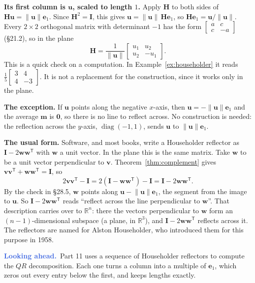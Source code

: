 \documentclass[11pt]{article}
\theoremstyle{plain}
\theoremstyle{definition}
\theoremstyle{remark}
\newcommand{\lookahead}{\par\smallskip\noindent
  \textbf{\sffamily\textcolor{RoyalBlue}{Looking ahead.}}\ \ignorespaces}
\newcommand{\R}{\mathbb{R}}
\newcommand{\vc}[1]{\mathbf{#1}}
\newcommand{\mt}[1]{\mathbf{#1}}
\newcommand{\norm}[1]{\lVert #1\rVert}
\newcommand{\T}{^{\mathsf{T}}}
\DeclareMathOperator{\diagop}{diag}
\begin{document}
\medskip
\noindent\textbf{Its first column is $\vc{u}$, scaled to length $1$.} Apply
$\mt{H}$ to both sides of $\mt{H}\vc{u}=\norm{\vc{u}}\vc{e}_1$. Since
$\mt{H}^{2}=\mt{I}$, this gives $\vc{u}=\norm{\vc{u}}\,\mt{H}\vc{e}_1$, so
$\mt{H}\vc{e}_1=\vc{u}/\norm{\vc{u}}$. Every $2\times2$ orthogonal matrix with
determinant $-1$ has the form $\begin{bmatrix}a&c\\c&-a\end{bmatrix}$ (\S21.2),
so in the plane
\[
  \mt{H}=\frac{1}{\norm{\vc{u}}}\begin{bmatrix}u_1&u_2\\u_2&-u_1\end{bmatrix}.
\]
This is a quick check on a computation. In Example~\ref{ex:householder} it reads
$\frac15\begin{bmatrix}3&4\\4&-3\end{bmatrix}$. It is not a replacement for the
construction, since it works only in the plane.

\medskip
\noindent\textbf{The exception.} If $\vc{u}$ points along the negative
$x$-axis, then $\vc{u}=-\norm{\vc{u}}\vc{e}_1$ and the average $\vc{m}$ is
$\vc{0}$, so there is no line to reflect across. No construction is needed:
the reflection across the $y$-axis, $\diagop(-1,1)$, sends $\vc{u}$ to
$\norm{\vc{u}}\vc{e}_1$.

\medskip
\noindent\textbf{The usual form.} Software, and most books, write a Householder
reflector as $\mt{I}-2\vc{w}\vc{w}\T$ with $\vc{w}$ a unit vector. In the plane
this is the same matrix. Take $\vc{w}$ to be a unit vector perpendicular to
$\vc{v}$. Theorem~\ref{thm:complement} gives
$\vc{v}\vc{v}\T+\vc{w}\vc{w}\T=\mt{I}$, so
\[
  2\vc{v}\vc{v}\T-\mt{I}
  =2(\mt{I}-\vc{w}\vc{w}\T)-\mt{I}
  =\mt{I}-2\vc{w}\vc{w}\T .
\]
By the check in \S28.5, $\vc{w}$ points along $\vc{u}-\norm{\vc{u}}\vc{e}_1$, the
segment from the image to $\vc{u}$. So $\mt{I}-2\vc{w}\vc{w}\T$ reads ``reflect
across the line perpendicular to $\vc{w}$''. That description carries over to
$\R^{n}$: there the vectors perpendicular to $\vc{w}$ form an
$(n-1)$-dimensional subspace (a plane, in $\R^{3}$), and
$\mt{I}-2\vc{w}\vc{w}\T$ reflects across it. The reflectors are named for Alston
Householder, who introduced them for this purpose in 1958.

\lookahead Part 11 uses a sequence of Householder reflectors to compute the
$QR$ decomposition. Each one turns a column into a multiple of $\vc{e}_1$,
which zeros out every entry below the first, and keeps lengths exactly.
\end{document}
